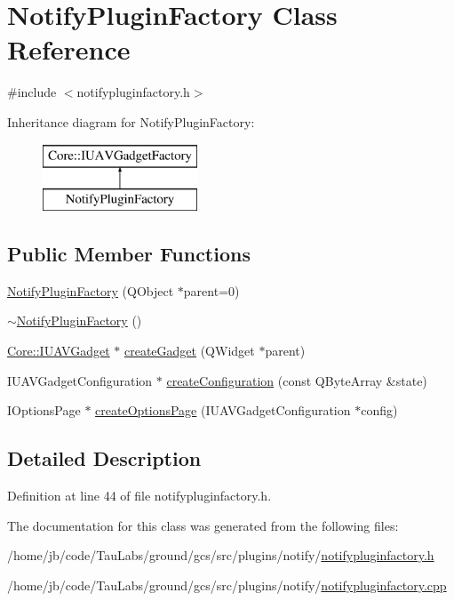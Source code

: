 \hypertarget{class_notify_plugin_factory}{\section{\-Notify\-Plugin\-Factory \-Class \-Reference}
\label{class_notify_plugin_factory}
}


{\ttfamily \#include $<$notifypluginfactory.\-h$>$}

\-Inheritance diagram for \-Notify\-Plugin\-Factory\-:\begin{figure}[H]
\begin{center}
\leavevmode
\includegraphics[height=2.000000cm]{class_notify_plugin_factory}
\end{center}
\end{figure}
\subsection*{\-Public \-Member \-Functions}
\begin{DoxyCompactItemize}
\item 
\hyperlink{group___notify_plugin_ga3c91b1f9c5a354b8d5886dd3cff94126}{\-Notify\-Plugin\-Factory} (\-Q\-Object $\ast$parent=0)
\item 
\hyperlink{group___notify_plugin_ga312b0e9ce81892b5388bb21c4f4c426a}{$\sim$\-Notify\-Plugin\-Factory} ()
\item 
\hyperlink{class_core_1_1_i_u_a_v_gadget}{\-Core\-::\-I\-U\-A\-V\-Gadget} $\ast$ \hyperlink{group___notify_plugin_gaf83c2c3d9f1f2adfa2629f31821c012e}{create\-Gadget} (\-Q\-Widget $\ast$parent)
\item 
\-I\-U\-A\-V\-Gadget\-Configuration $\ast$ \hyperlink{group___notify_plugin_gade4f4f78125740032a0bd6d3e920d131}{create\-Configuration} (const \-Q\-Byte\-Array \&state)
\item 
\-I\-Options\-Page $\ast$ \hyperlink{group___notify_plugin_ga04b86d8ce232e043459331bd3ab5d05d}{create\-Options\-Page} (\-I\-U\-A\-V\-Gadget\-Configuration $\ast$config)
\end{DoxyCompactItemize}


\subsection{\-Detailed \-Description}


\-Definition at line 44 of file notifypluginfactory.\-h.



\-The documentation for this class was generated from the following files\-:\begin{DoxyCompactItemize}
\item 
/home/jb/code/\-Tau\-Labs/ground/gcs/src/plugins/notify/\hyperlink{notifypluginfactory_8h}{notifypluginfactory.\-h}\item 
/home/jb/code/\-Tau\-Labs/ground/gcs/src/plugins/notify/\hyperlink{notifypluginfactory_8cpp}{notifypluginfactory.\-cpp}\end{DoxyCompactItemize}
